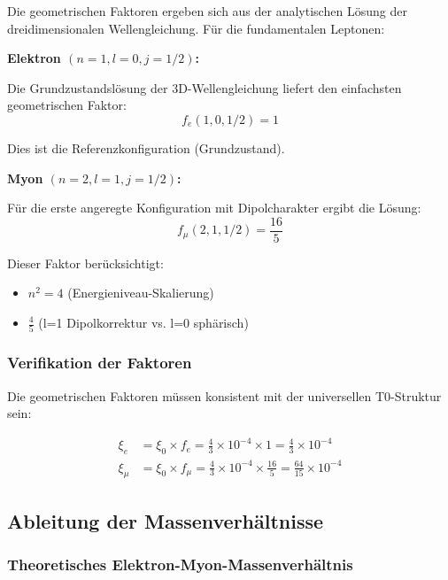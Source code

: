 \documentclass[12pt,a4paper]{article}
\theoremstyle{definition}
\begin{document}
Die geometrischen Faktoren ergeben sich aus der analytischen L{\"o}sung der dreidimensionalen Wellengleichung. F{\"u}r die fundamentalen Leptonen:

\textbf{Elektron $(n=1, l=0, j=1/2)$:}

Die Grundzustandsl{\"o}sung der 3D-Wellengleichung liefert den einfachsten geometrischen Faktor:
\begin{equation}
	f_e(1,0,1/2) = 1
\end{equation}

Dies ist die Referenzkonfiguration (Grundzustand).

\textbf{Myon $(n=2, l=1, j=1/2)$:}

F{\"u}r die erste angeregte Konfiguration mit Dipolcharakter ergibt die L{\"o}sung:
\begin{equation}
	f_\mu(2,1,1/2) = \frac{16}{5}
\end{equation}

Dieser Faktor ber{\"u}cksichtigt:
\begin{itemize}
	\item $n^2 = 4$ (Energieniveau-Skalierung)
	\item $\frac{4}{5}$ (l=1 Dipolkorrektur vs. l=0 sph{\"a}risch)
\end{itemize}

\subsubsection{Verifikation der Faktoren}

Die geometrischen Faktoren m{\"u}ssen konsistent mit der universellen T0-Struktur sein:

\begin{align}
	\xi_e &= \xi_0 \times f_e = \frac{4}{3} \times 10^{-4} \times 1 = \frac{4}{3} \times 10^{-4}\\
	\xi_\mu &= \xi_0 \times f_\mu = \frac{4}{3} \times 10^{-4} \times \frac{16}{5} = \frac{64}{15} \times 10^{-4}
\end{align}

\subsection{Ableitung der Massenverh{\"a}ltnisse}

\subsubsection{Theoretisches Elektron-Myon-Massenverh{\"a}ltnis}
\end{document}
